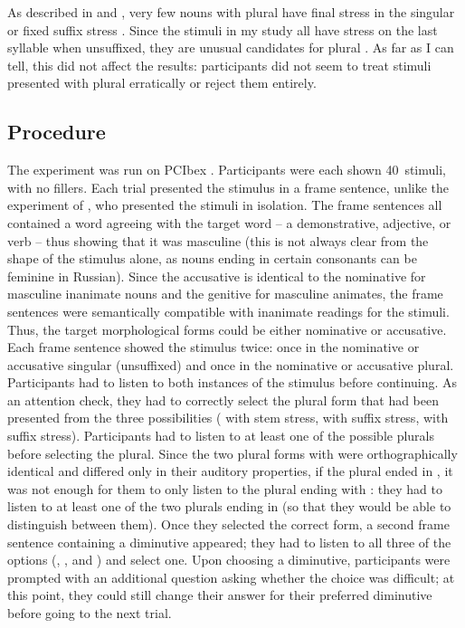 \documentclass[output=paper,colorlinks,citecolor=brown
]{langscibook}
\begin{document}
As described in  and , very few nouns with plural \pla{} have final stress in the singular or fixed suffix stress \citep[cf.][]{Shapiro1985}. Since the stimuli in my study all have stress on the last syllable when unsuffixed, they are unusual candidates for plural \pla. As far as I can tell, this did not affect the results: participants did not seem to treat stimuli presented with plural \pla{} erratically or reject them entirely. %

\subsection{Procedure}\label{sec:expproc}
The experiment was run on PCIbex \citep{Zehr.Schwarz2022}. Participants were each shown 40~stimuli, with no fillers. Each trial presented the stimulus in a frame sentence, unlike the experiment of \citet{Gouskova2012}, who presented the stimuli in isolation. The frame sentences all contained a word agreeing with the target word -- a demonstrative, adjective, or verb -- thus showing that it was masculine (this is not always clear from the shape of the stimulus alone, as nouns ending in certain consonants can be feminine in Russian). Since the accusative is identical to the nominative for masculine inanimate nouns and the genitive for masculine animates, the frame sentences were semantically compatible with inanimate readings for the stimuli. Thus, the target morphological forms could be either nominative or accusative. Each frame sentence showed the stimulus twice: once in the nominative or accusative singular (unsuffixed) and once in the nominative or accusative plural. Participants had to listen to both instances of the stimulus before continuing. As an attention check, they had to correctly select the plural form that had been presented from the three possibilities (\pli{} with stem stress, \plsi{} with suffix stress, \pla{} with suffix stress). Participants had to listen to at least one of the possible plurals before selecting the plural. Since the two plural forms with \pli{} were orthographically identical and differed only in their auditory properties, if the plural ended in \pli{}, it was not enough for them to only listen to the plural ending with \pla{}: they had to listen to at least one of the two plurals ending in \pli{} (so that they would be able to distinguish between them). Once they selected the correct form, a second frame sentence containing a diminutive appeared; they had to listen to all three of the options (\ok, \ik, and \chik) and select one. Upon choosing a diminutive, participants were prompted with an additional question asking whether the choice was difficult; at this point, they could still change their answer for their preferred diminutive before going to the next trial.
\end{document}
